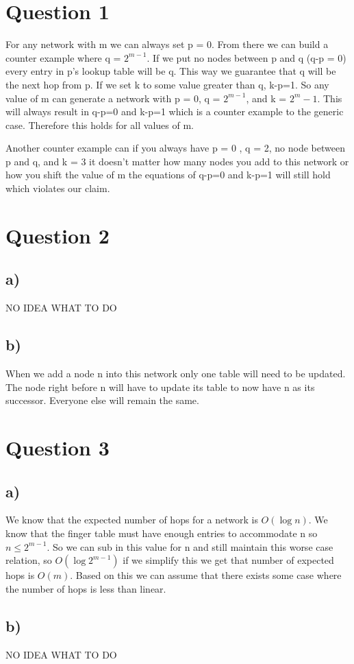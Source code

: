 \documentclass[12pt]{article}
\begin{document}
\section{Question 1} %
\label{sec:question_1}
For any network with m we can always set p = 0. From there we can build a counter example where q = $2^{m-1}$. If we put no nodes between p and q (q-p = 0) every entry in p's lookup table will be q. This way we guarantee that q will be the next hop from p. If we set k to some value greater than q, k-p=1. So any value of m can generate a network with p = 0, q = $2^{m-1}$, and k = $2^m-1$. This will always result in q-p=0 and k-p=1 which is a counter example to the generic case. Therefore this holds for all values of m. 


Another counter example can if you always have p = 0 , q = 2, no node between p and q, and k = 3 it doesn't matter how many nodes you add to this network or how you shift the value of m the equations of q-p=0 and k-p=1 will still hold which violates our claim. 


\section{Question 2} %
\label{sec:question_2}
\subsection{a)} %
\label{sub:a_}
NO IDEA WHAT TO DO



\subsection{b)} %
\label{sub:b_}
When we add a node n into this network only one table will need to be updated. The node right before n will have to update its table to now have n as its successor. Everyone else will remain the same.




\section{Question 3} %
\label{sec:question_3}
\subsection{a)} %
\label{sub:a_}
We know that the expected number of hops for a network is $O(\log n)$. We know that the finger table must have enough entries to accommodate n so $n\le 2^{m-1}$. So we can sub in this value for n and still maintain this worse case relation, so $O(\log 2^{m-1})$ if we simplify this we get that number of expected hops is $O(m)$. Based on this we can assume that there exists some case where the number of hops is less than linear. 

\subsection{b)} %
\label{sub:b_}
NO IDEA WHAT TO DO



\end{document}
